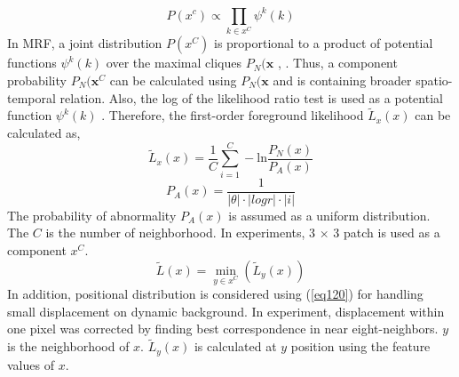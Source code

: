 \documentclass[conference]{IEEEtran}
\begin{document}
\begin{equation}\label{eq:90}
  P(x^c) \propto \prod_{k \in x^C} \psi ^k (k)
\end{equation}
In MRF, a joint distribution \begin{math} P(x^C) \end{math}  is proportional to a product of potential functions \begin{math} \psi^k(k) \end{math}  over the maximal cliques \begin{math} P_N(\mathbf{x} \end{math} , \cite{Bishop}. Thus, a component probability \begin{math} P_N(\mathbf{x}^C \end{math}  can be calculated using \begin{math} P_N(\mathbf{x} \end{math}  and is containing broader spatio-temporal relation. Also, the log of the likelihood ratio test \cite{Sheikh} is used as a potential function \begin{math} \psi^k(k) \end{math} . Therefore, the first-order foreground likelihood \begin{math} \tilde{L}_x(x) \end{math} can be calculated as,
\begin{equation}\label{eq:100}
  \tilde{L}_x(x) = \frac{1}{C} \sum_{i=1}^C - \textrm{ln} \frac{P_N(x)} {P_A(x)}
\end{equation}
\begin{equation}\label{eq:110}
  P_A(x) = \frac{1}{| \theta | \cdot |logr| \cdot |i|}
\end{equation}
The probability of abnormality $ P_A(x) $ is assumed as a uniform distribution. The $ C $ is the number of neighborhood. In experiments, 3 $ \times $ 3 patch is used as a component $ x^C $. 
\begin{equation}\label{eq:120}
  \tilde{L}(x) =  \underset{y \in x^C}{\operatorname{min}}  (\tilde{L}_y(x))
\end{equation}
In addition, positional distribution is considered using (\ref{eq120}) for handling small displacement on dynamic background. In experiment, displacement within one pixel was corrected by finding best correspondence in near eight-neighbors. \begin{math} y \end{math} is the neighborhood of \begin{math} x \end{math}. \begin{math} \tilde{L}_y(x) \end{math}  is calculated at \begin{math} y \end{math} position using the feature values of \begin{math} x \end{math}.
\end{document}

